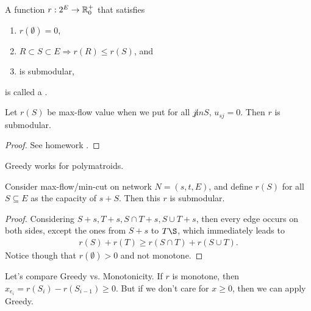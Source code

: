 \begin{definition}
    A function $r : 2^E \rightarrow \mathbb{R}^+_0$ that satisfies
    \begin{enumerate}
        \item $r(\emptyset) = 0$,
        \item $R \subset S \subset E \Rightarrow r(R) \leq r(S)$, and
        \item is submodular,
    \end{enumerate}
    is called a .
\end{definition}
\begin{theorem}
    Let $r(S)$ be max-flow value when we put for all $j \not in S$, $u_{sj}=0$.
    Then $r$ is submodular.
\end{theorem}
\begin{proof}
    See homework .
\end{proof}
\begin{theorem}
    Greedy works for polymatroids.
\end{theorem}
\begin{theorem}
    Consider max-flow/min-cut on network $N =(s,t,E)$, and define $r(S)$ for all $S \subseteq E$
    as the capacity of $s+S$. Then this $r$ is submodular.
\end{theorem}
\begin{proof}
    Considering $S+s,T+s,S\cap T+s, S \cup T+s$, then every edge occurs on both sides,
    except the ones from $S+s$ to $T\S$, which immediately leads to
    \begin{align*}
        r(S) + r(T) \geq r(S \cap T) + r(S \cup T).
    \end{align*}
    Notice though that $r(\emptyset) > 0$ and not monotone.
\end{proof}
Let's compare Greedy vs. Monotonicity.
If $r$ is monotone, then $x_{e_i}=r(S_i)-r(S_{i-1}) \geq 0$.
But if we don't care for $x \geq 0$, then we can apply Greedy.

